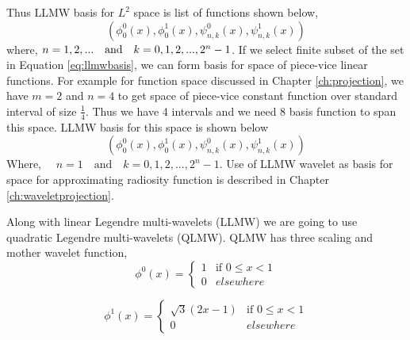 Thus LLMW basis for $L^2$ space is list of functions shown below,
\begin{equation}\label{eq:llmwbasis}
(\phi^0_0(x),\phi^1_0(x),\psi^0_{n,k}(x),\psi^1_{n,k}(x))
\end{equation}
where, $\quad \\n= 1, 2,...\quad \text{and} \quad k=0,1,2,...,2^n-1$.
If we select finite subset of the set in Equation \ref{eq:llmwbasis}, we can form basis for space of piece-vice linear functions. For example for function space discussed in Chapter \ref{ch:projection}, we have $m=2$ and $n=4$ to get space of piece-vice constant function over standard interval of size $\frac{1}{4}$. Thus we have 4 intervals and we need 8 basis function to span this space. LLMW basis for this space is shown below
\begin{equation}\label{eq:haarbasis_n4}
(\phi^0_0(x),\phi^1_0(x),\psi^0_{n,k}(x),\psi^1_{n,k}(x))
\end{equation}
Where, $\quad n= 1 \quad \text{and} \quad k=0,1,2,...,2^n-1$. Use of LLMW wavelet as basis for space for approximating radiosity function is described in Chapter \ref{ch:waveletprojection}.

Along with linear Legendre multi-wavelets (LLMW) we are going to use quadratic Legendre multi-wavelets (QLMW). QLMW has three scaling and mother wavelet function, 
\begin{equation}\label{eq:qlmwphi0}
\phi^0(x)=
\left\{
    \begin{array}{ll}
        1  & \mbox{if } 0 \leq x < 1 \\
        0 & elsewhere
    \end{array}
\right.
\end{equation}

\begin{equation}\label{eq:qlmwphi1}
\phi^1(x)=
\left\{
    \begin{array}{ll}
        \sqrt{3}(2x-1)  & \mbox{if } 0 \leq x < 1 \\
        0 & elsewhere
    \end{array}
\right.
\end{equation}

